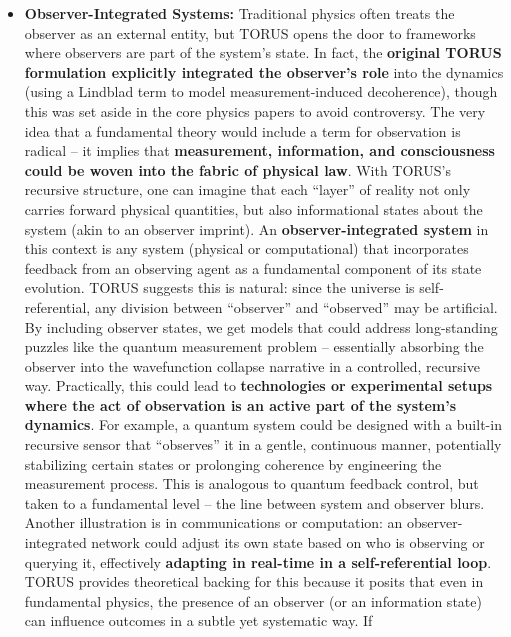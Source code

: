 \documentclass[
]{article}
\begin{document}
\begin{itemize}
\item
  \textbf{Observer-Integrated Systems:} Traditional physics often treats
  the observer as an external entity, but TORUS opens the door to
  frameworks where observers are part of the system's state. In fact,
  the \textbf{original TORUS formulation explicitly integrated the
  observer's role} into the dynamics (using a Lindblad term to model
  measurement-induced decoherence), though this was set aside in the
  core physics papers to avoid controversy\hspace{0pt}. The very idea
  that a fundamental theory would include a term for observation is
  radical -- it implies that \textbf{measurement, information, and
  consciousness could be woven into the fabric of physical law}. With
  TORUS's recursive structure, one can imagine that each ``layer'' of
  reality not only carries forward physical quantities, but also
  informational states about the system (akin to an observer imprint).
  An \textbf{observer-integrated system} in this context is any system
  (physical or computational) that incorporates feedback from an
  observing agent as a fundamental component of its state evolution.
  TORUS suggests this is natural: since the universe is
  self-referential, any division between ``observer'' and ``observed''
  may be artificial. By including observer states, we get models that
  could address long-standing puzzles like the quantum measurement
  problem -- essentially absorbing the observer into the wavefunction
  collapse narrative in a controlled, recursive way\hspace{0pt}.
  Practically, this could lead to \textbf{technologies or experimental
  setups where the act of observation is an active part of the system's
  dynamics}. For example, a quantum system could be designed with a
  built-in recursive sensor that ``observes'' it in a gentle, continuous
  manner, potentially stabilizing certain states or prolonging coherence
  by engineering the measurement process. This is analogous to quantum
  feedback control, but taken to a fundamental level -- the line between
  system and observer blurs. Another illustration is in communications
  or computation: an observer-integrated network could adjust its own
  state based on who is observing or querying it, effectively
  \textbf{adapting in real-time in a self-referential loop}. TORUS
  provides theoretical backing for this because it posits that even in
  fundamental physics, the presence of an observer (or an information
  state) can influence outcomes in a subtle yet systematic way. If

\end{itemize}
\end{document}
